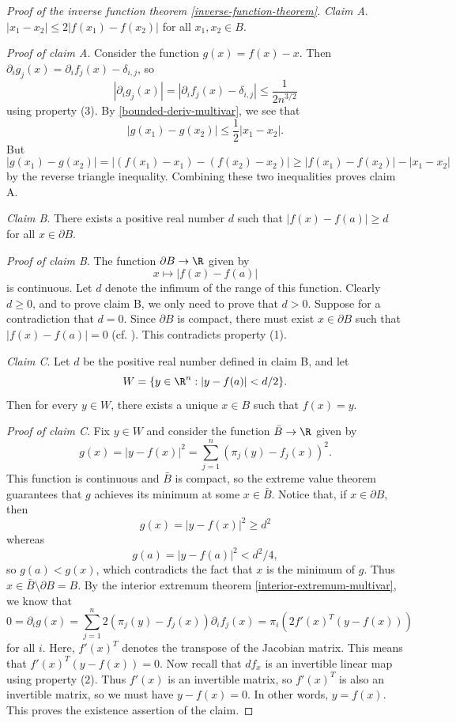 \begin{proof}[Proof of the inverse function theorem \ref{inverse-function-theorem}]
	\mbox{}
	
	\noindent \textit{Claim A}. $|x_1 - x_2| \leq 2|f(x_1) - f(x_2)|$ for all $x_1, x_2 \in B$. 
	
	\mbox{}
	
	\noindent \textit{Proof of claim A}. Consider the function $g(x) = f(x) - x$. Then $\partial_i g_j(x) = \partial_i f_j(x) - \delta_{i,j}$, so
	\[ |\partial_i g_j (x)| = |\partial_i f_j(x) - \delta_{i,j}| \leq \frac{1}{2n^{3/2}} \]
	using property (3). By \cref{bounded-deriv-multivar}, we see that 
	\[ |g(x_1) - g(x_2)| \leq \frac{1}{2} |x_1 - x_2|. \]
	But
	\[ |g(x_1) - g(x_2)| = |(f(x_1) - x_1) - (f(x_2) - x_2)| \geq |f(x_1) - f(x_2)| - |x_1 - x_2| \]
	by the reverse triangle inequality. Combining these two inequalities proves claim A. 
	
	\mbox{} 
	
	\noindent \textit{Claim B}. There exists a positive real number $d$ such that $|f(x) - f(a)| \geq d$ for all $x  \in \partial B$. 
	
	\mbox{} 
	
	\noindent \textit{Proof of claim B}. The function $\partial B \to \R$ given by 
	\[ x \mapsto |f(x) - f(a)| \]
	is continuous. Let $d$ denote the infimum of the range of this function. Clearly $d \geq 0$, and to prove claim B, we only need to prove that $d > 0$. Suppose for a contradiction that $d = 0$. Since $\partial B$ is compact, there must exist $x \in \partial B$ such that $|f(x) - f(a)| = 0$ (cf. \cite[theorem 6.30]{protter-morrey}). This contradicts property (1). 
	
	\mbox{}
	
	\noindent \textit{Claim C}. Let $d$ be the positive real number defined in claim B, and let \[ W = \{ y \in \R^n : |y -f(a)| < d/2 \}. \]
	Then for every $y \in W$, there exists a unique $x \in B$ such that $f(x) = y$. 
	
	\mbox{}
	
	\noindent \textit{Proof of claim C}. Fix $y \in W$ and consider the function $\bar{B} \to \R$ given by
	\[ g(x) = |y - f(x)|^2 = \sum_{j = 1}^n (\pi_j(y) - f_j(x))^2. \]
	This function is continuous and $\bar{B}$ is compact, so the extreme value theorem guarantees that $g$ achieves its minimum at some $x \in \bar{B}$. Notice that, if $x \in \partial B$, then
	\[ g(x) = |y - f(x)|^2 \geq d^2 \]
	whereas
	\[ g(a) = |y - f(a)|^2 < d^2/4, \]
	so $g(a) < g(x)$, which contradicts the fact that $x$ is the minimum of $g$. Thus $x \in \bar{B} \setminus \partial B = B$. By the interior extremum theorem \ref{interior-extremum-multivar}, we know that
	\[ 0 = \partial_i g(x) = \sum_{j = 1}^n 2(\pi_j(y) - f_j(x)) \partial_i f_j(x) = \pi_i \left( 2 f'(x)^T (y - f(x)) \right) \]
	for all $i$. Here, $f'(x)^T$ denotes the transpose of the Jacobian matrix. This means that $f'(x)^T(y - f(x)) = 0$. Now recall that $df_x$ is an invertible linear map using property (2). Thus $f'(x)$ is an invertible matrix, so $f'(x)^T$ is also an invertible matrix, so we must have $y - f(x) = 0$. In other words, $y = f(x)$. This proves the existence assertion of the claim.
	

\end{proof}
